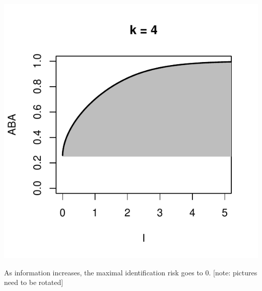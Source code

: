 \documentclass{beamer}
\begin{document}
\begin{frame}
\begin{center}
\includegraphics[scale = 0.34]{ck_4.pdf}
\end{center}
As information increases, the maximal identification risk goes to 0.
[note: pictures need to be rotated]

\end{frame}
\end{document}
